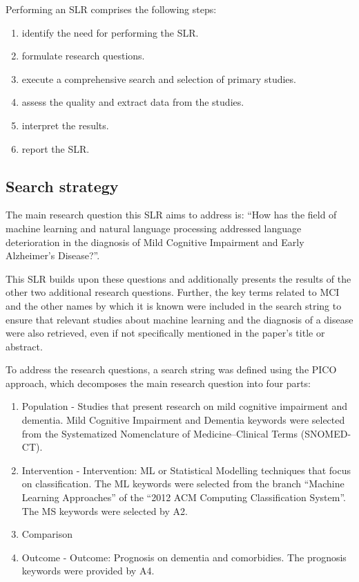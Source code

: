 \documentclass[10pt, letterpaper, twoside, openany]{thesis}
\begin{document}
Performing an SLR comprises the following steps: 

\begin{enumerate}
	\item identify the need for performing the SLR.
	\item formulate research questions.
	\item execute a comprehensive search and selection of primary studies.
	\item assess the quality and extract data from the studies.
	\item interpret the results.
	\item report the SLR.
\end{enumerate}

\subsection{Search strategy}
The main research question this SLR aims to address is: “How has the field of machine learning and natural language processing addressed language deterioration in the diagnosis of Mild Cognitive Impairment and Early Alzheimer's Disease?”. 

This SLR builds upon these questions and additionally presents the results of the other two additional research questions. Further, the key terms related to MCI and the other names by which it is known were included in the search string to ensure that relevant studies about machine learning and the diagnosis of a disease were also retrieved, even if not specifically mentioned in the paper's title or abstract.
\par 
To address the research questions, a search string was defined using the PICO approach, which decomposes the main research question into four parts: 
\begin{enumerate}
	\item Population - Studies that present research on mild cognitive impairment and dementia. Mild Cognitive Impairment and Dementia keywords were selected from the Systematized Nomenclature of Medicine–Clinical Terms (SNOMED-CT).
	\item Intervention - Intervention: ML or Statistical Modelling techniques that focus on classification. The ML keywords were selected from the branch “Machine Learning Approaches” of the “2012 ACM Computing Classification System”. The MS keywords were selected by A2.
	\item Comparison
	\item Outcome - Outcome: Prognosis on dementia and comorbidies. The prognosis keywords were provided
by A4.
\end{enumerate}
\end{document}
